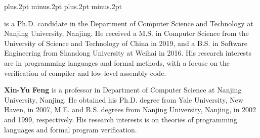\documentclass[twoside]{article}
\begin{document}
\begin{multicols}{2}

  \balance
  
  
  
  
  
  

  {
    \footnotesize
    \itemsep=-3pt plus.2pt minus.2pt
    \baselineskip=13pt plus.2pt minus.2pt
    }

    \vspace{5mm}

\noindent\parbox{8.3cm}
  {
  {\small{}  
  is a Ph.D. candidate in the Department of Computer Science 
  and Technology at Nanjing University, Nanjing. 
  He received a M.S. in Computer Science from 
  the University of Science and Technology of China
  in 2019, 
  and a B.S. in Software Engineering from Shandong 
  University at Weihai in 2016. His research interests
  are in programming languages and formal methods, 
  with a focuse on the verification of compiler 
  and low-level assembly code.}\\[1mm]}

\noindent\parbox{8.3cm}
{
{\small\quad 
  {\bf Xin-Yu Feng}  
  is a professor in Department of Computer Science 
  at Nanjing University, Nanjing. He obtained his Ph.D. 
  degree from Yale University, New Haven, 
  in 2007, M.E. and B.S. 
  degrees from Nanjing University, 
  Nanjing, in 2002 and 1999, respectively. 
  His research interests is on theories 
  of programming languages and 
  formal program verification. }\\[1mm]}


\end{multicols}
\end{document}
